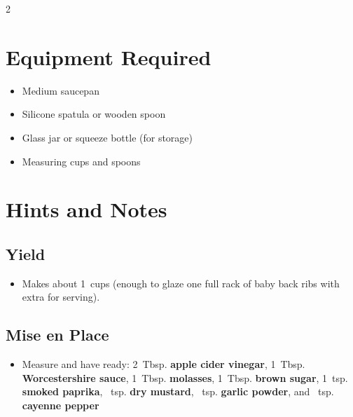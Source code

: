 \documentclass[11pt,letterpaper]{article}
\begin{document}
{\footnotesize
\setlength{\columnsep}{20pt}
\setlength{\multicolsep}{6pt}
\begin{multicols}{2}
\setlength{\parindent}{0pt}
\setlength{\parskip}{2pt}
\setlength{\itemsep}{0pt}
\setlength{\parsep}{0pt}

\section*{Equipment Required}
\begin{itemize}
    \item Medium saucepan
    \item Silicone spatula or wooden spoon
    \item Glass jar or squeeze bottle (for storage)
    \item Measuring cups and spoons
\end{itemize}

\section*{Hints and Notes}

\subsection*{Yield}
\begin{itemize}
    \item Makes about 1~cups (enough to glaze one full rack of baby back ribs with extra for serving).
\end{itemize}

\subsection*{Mise en Place}
\begin{itemize}
    \item Measure and have ready: 2~Tbsp. \textbf{apple cider vinegar}, 1~Tbsp. \textbf{Worcestershire sauce}, 1~Tbsp. \textbf{molasses}, 1~Tbsp. \textbf{brown sugar}, 1~tsp. \textbf{smoked paprika}, ~tsp. \textbf{dry mustard}, ~tsp. \textbf{garlic powder}, and ~tsp. \textbf{cayenne pepper}
\end{itemize}


\end{multicols}}
\end{document}
